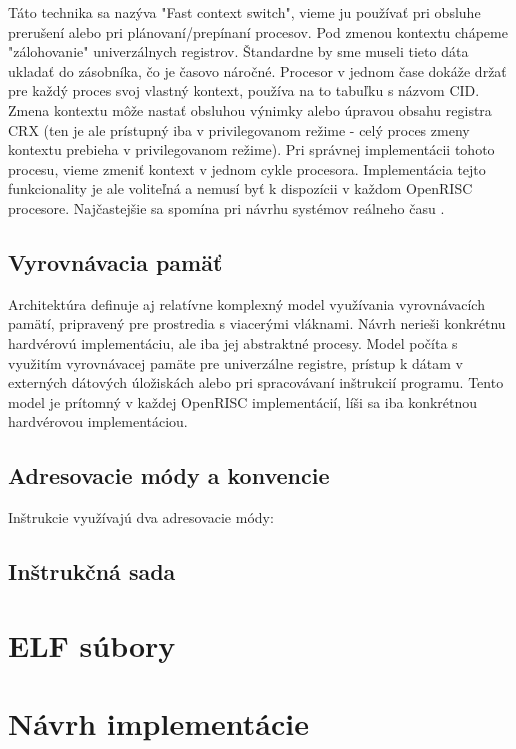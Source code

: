 \documentclass[conference]{IEEEtran}
\begin{document}
Táto technika sa nazýva "Fast context switch", vieme ju používať pri obsluhe prerušení alebo pri  plánovaní/prepínaní procesov. Pod zmenou kontextu chápeme "zálohovanie" univerzálnych registrov. Štandardne by sme museli tieto dáta ukladať do zásobníka, čo je časovo náročné.  Procesor v jednom čase dokáže držať pre každý proces svoj vlastný kontext, používa na to tabuľku s názvom CID. Zmena kontextu môže nastať obsluhou výnimky alebo úpravou obsahu registra CRX (ten je ale prístupný iba v privilegovanom režime - celý proces zmeny kontextu prebieha v privilegovanom režime). Pri správnej implementácii tohoto procesu, vieme zmeniť kontext v jednom cykle procesora. Implementácia tejto funkcionality je ale voliteľná a nemusí byť k dispozícii v každom OpenRISC procesore. Najčastejšie sa spomína pri návrhu systémov reálneho času \cite{Snyder1995FastCS}.

\subsection{Vyrovnávacia pamäť}

Architektúra definuje aj relatívne komplexný model využívania vyrovnávacích pamätí, pripravený pre   prostredia s viacerými vláknami. Návrh nerieši konkrétnu hardvérovú implementáciu, ale iba jej abstraktné procesy. Model počíta s využitím vyrovnávacej pamäte pre univerzálne registre, prístup k dátam v externých dátových úložiskách alebo pri spracovávaní inštrukcií programu. Tento model je prítomný v každej OpenRISC implementácií, líši sa iba konkrétnou hardvérovou implementáciou.

\subsection{Adresovacie módy a konvencie}

Inštrukcie využívajú dva adresovacie módy: 

\subsection{Inštrukčná sada}

\section{ELF súbory}

\section{Návrh implementácie}
\end{document}

